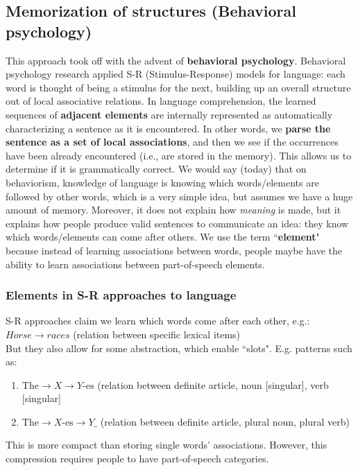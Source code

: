 \subsection{Memorization of structures (Behavioral psychology)}
This approach took off with the advent of \textbf{behavioral psychology}.
Behavioral psychology research applied S-R (Stimulus-Response) models for language: each word is thought of being a stimulus for the next, building up an overall structure out of local associative relations.
In language comprehension, the learned sequences of \textbf{adjacent elements} are internally represented as automatically characterizing a sentence as it is encountered. In other words, we \textbf{parse the sentence as a set of local associations}, and then we see if the occurrences have been already encountered (i.e., are stored in the memory). This allows us to determine if it is grammatically correct. We would say (today) that on behaviorism, knowledge of language is 
knowing which words/elements are followed by other words, which is a very simple idea, but assumes we have a huge amount of memory.
Moreover, it does not explain how \textit{meaning} is made, but it explains how people produce valid sentences to communicate an idea: they know which words/elements can come after others.
We use the term ``\textbf{element}" because instead of learning associations between words, people maybe have the ability to learn associations between part-of-speech elements.

\subsubsection{Elements in S-R approaches to language}
S-R approaches claim we learn which words come after each other, e.g.:\\
$Horse \rightarrow races$ (relation between specific lexical items)\\
But they also allow for some abstraction, which enable ``slots". E.g. patterns such as:
\begin{enumerate}
    \item $\text{The} \rightarrow X \rightarrow Y\text{-es}$ (relation between definite article, noun [singular], verb [singular]
    \item $\text{The} \rightarrow X\text{-es}\rightarrow Y\_$ (relation between definite article, plural noun, plural verb)
\end{enumerate}
This is more compact than storing single words' associations. However, this compression requires people to have part-of-speech categories.

